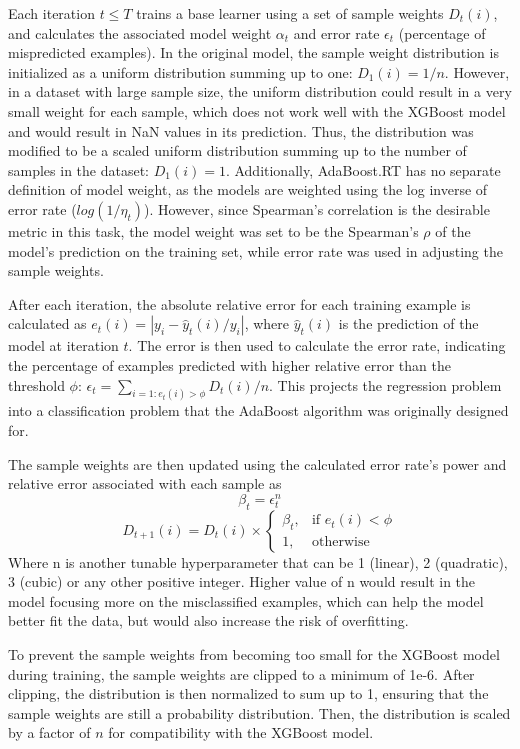 Each iteration $t\leq T$ trains a base learner using a set of sample weights $D_t(i)$, and calculates the associated model weight $\alpha_t$ and error rate $\epsilon_t$ (percentage of mispredicted examples).
In the original model, the sample weight distribution is initialized as a uniform distribution summing up to one: $D_1(i) = 1/n$. However, in a dataset with large sample size, the uniform distribution could result in a very small weight for each sample, which does not work well with the XGBoost model and would result in NaN values in its prediction. Thus, the distribution was modified to be a scaled uniform distribution summing up to the number of samples in the dataset: $D_1(i) = 1$. Additionally, AdaBoost.RT has no separate definition of model weight, as the models are weighted using the log inverse of error rate ($log(1/\eta_t)$). However, since Spearman's correlation is the desirable metric in this task, the model weight was set to be the Spearman's $\rho$ of the model's prediction on the training set, while error rate was used in adjusting the sample weights.

After each iteration, the absolute relative error for each training example is calculated as $e_t(i) = |y_i - \hat{y}_t(i)/y_i|$, where $\hat{y}_t(i)$ is the prediction of the model at iteration $t$. The error is then used to calculate the error rate, indicating the percentage of examples predicted with higher relative error than the threshold $\phi$: $\epsilon_t = \sum_{i=1: e_t(i) > \phi} D_t(i) / n$. This projects the regression problem into a classification problem that the AdaBoost algorithm was originally designed for.

The sample weights are then updated using the calculated error rate's power and relative error associated with each sample as 
$$
\beta_t = \epsilon_t ^ n
$$
$$
D_{t+1}(i) = D_t(i) \times \begin{cases}
    \beta_t, & \text{if } e_t(i) < \phi \\
    1, & \text{otherwise}
\end{cases}
$$
Where n is another tunable hyperparameter that can be 1 (linear), 2 (quadratic), 3 (cubic) or any other positive integer. Higher value of n would result in the model focusing more on the misclassified examples, which can help the model better fit the data, but would also increase the risk of overfitting.

To prevent the sample weights from becoming too small for the XGBoost model during training, the sample weights are clipped to a minimum of 1e-6. After clipping, the distribution is then normalized to sum up to 1, ensuring that the sample weights are still a probability distribution. Then, the distribution is scaled by a factor of $n$ for compatibility with the XGBoost model.

